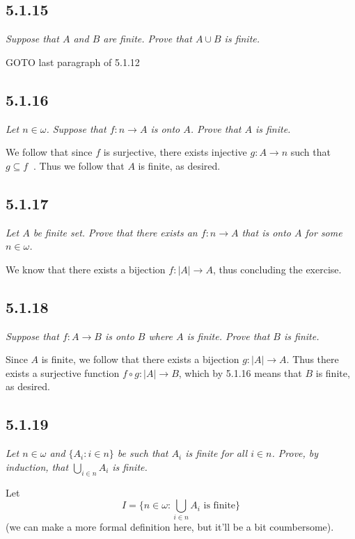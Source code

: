 \documentclass[11pt,oneside,titlepage]{book}
\DeclareMathOperator \inv {^{-1}}
\begin{document}
\subsection*{5.1.15}

\textit{Suppose that $A$ and $B$ are finite. Prove that $A \cup B$ is finite.}

GOTO last paragraph of 5.1.12

\subsection*{5.1.16}

\textit{Let $n \in \omega$. Suppose that $f: n \to A$ is onto $A$. Prove that $A$ is finite.}

We follow that since $f$ is surjective, there exists injective $g: A \to n$ such that
$g \subseteq f\inv$. Thus we follow that $A$ is finite, as desired.

\subsection*{5.1.17}

\textit{Let $A$ be finite set. Prove that there exists an $f: n \to A$ that is onto $A$
  for some $n \in \omega$.}

We know that there exists a bijection $f: |A| \to A$, thus concluding the exercise.

\subsection*{5.1.18}

\textit{Suppose that $f: A \to B$ is onto $B$ where $A$ is finite. Prove that $B$ is finite.}

Since $A$ is finite, we follow that there exists a bijection $g: |A| \to A$. Thus there
exists a surjective function $f \circ g : |A| \to B$, which by 5.1.16 means that $B$ is finite,
as desired.

\subsection*{5.1.19}

\textit{Let $n \in \omega$ and $\{A_i: i \in n\}$ be such that $A_i$ is finite for all
  $i \in n$. Prove, by induction, that $\bigcup_{i \in n}{A_i}$ is finite.}

Let
$$I = \{n \in \omega: \bigcup_{i \in n}{A_i} \text{ is finite}\}$$
(we can make a more formal definition here, but it'll be a bit coumbersome).
\end{document}
